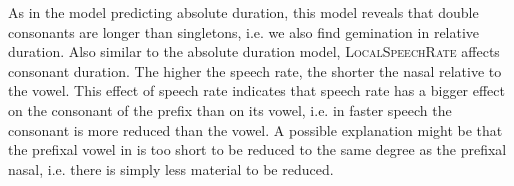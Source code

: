 \begin{table}
	\caption{ Summary of linear model for variables predicting the Box-Cox-transformed relative duration of [m]  in prefixed words}
	\label{tbl: summary model rel du in corpus}
	
	


\end{table}


As in the model predicting absolute duration, this model reveals that double consonants are longer than singletons, i.e. we also find gemination in relative duration. Also similar to the absolute duration model, \textsc{LocalSpeechRate} affects consonant duration. The higher the speech rate, the shorter the nasal relative to the vowel. This effect of speech rate indicates that speech rate has a bigger effect on the consonant of the prefix  than on its vowel, i.e. in faster speech the consonant is more reduced than the vowel. A possible explanation might be that the prefixal vowel in  is too short to be reduced to the same degree as the prefixal nasal, i.e. there is simply less material to be reduced.

